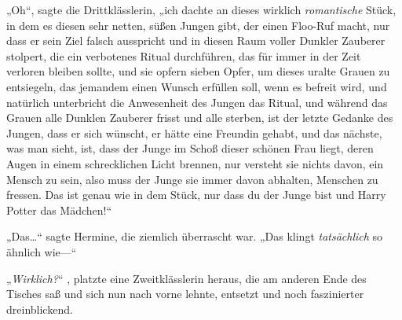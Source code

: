 „Oh“, sagte die Drittklässlerin, „ich dachte an dieses wirklich \emph{romantische} Stück, in dem es diesen sehr netten, süßen Jungen gibt, der einen Floo-Ruf macht, nur dass er sein Ziel falsch ausspricht und in diesen Raum voller Dunkler Zauberer stolpert, die ein verbotenes Ritual durchführen, das für immer in der Zeit verloren bleiben sollte, und sie opfern sieben Opfer, um dieses uralte Grauen zu entsiegeln, das jemandem einen Wunsch erfüllen soll, wenn es befreit wird, und natürlich unterbricht die Anwesenheit des Jungen das Ritual, und während das Grauen alle Dunklen Zauberer frisst und alle sterben, ist der letzte Gedanke des Jungen, dass er sich wünscht, er hätte eine Freundin gehabt, und das nächste, was man sieht, ist, dass der Junge im Schoß dieser schönen Frau liegt, deren Augen in einem schrecklichen Licht brennen, nur versteht sie nichts davon, ein Mensch zu sein, also muss der Junge sie immer davon abhalten, Menschen zu fressen. Das ist genau wie in dem Stück, nur dass du der Junge bist und Harry Potter das Mädchen!“

„Das…“ sagte Hermine, die ziemlich überrascht war. „Das klingt \emph{tatsächlich} so ähnlich wie—“

„\emph{Wirklich?}“ , platzte eine Zweitklässlerin heraus, die am anderen Ende des Tisches saß und sich nun nach vorne lehnte, entsetzt und noch faszinierter dreinblickend.

